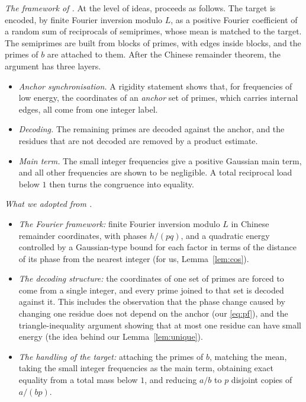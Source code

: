 \documentclass[11pt]{amsart}
\theoremstyle{definition}
\theoremstyle{remark}
\begin{document}
\emph{The framework of \cite{Tan26}.} At the level of ideas, \cite{Tan26} proceeds as follows. The target is encoded, by finite Fourier inversion modulo $L$, as a positive Fourier coefficient of a random sum of reciprocals of semiprimes, whose mean is matched to the target. The semiprimes are built from blocks of primes, with edges inside blocks, and the primes of $b$ are attached to them. After the Chinese remainder theorem, the argument has three layers.
\begin{itemize}
\item \emph{Anchor synchronisation.} A rigidity statement shows that, for frequencies of low energy, the coordinates of an \emph{anchor} set of primes, which carries internal edges, all come from one integer label.
\item \emph{Decoding.} The remaining primes are decoded against the anchor, and the residues that are not decoded are removed by a product estimate.
\item \emph{Main term.} The small integer frequencies give a positive Gaussian main term, and all other frequencies are shown to be negligible. A total reciprocal load below $1$ then turns the congruence into equality.
\end{itemize}


\emph{What we adopted from \cite{Tan26}.}
\begin{itemize}
\item \emph{The Fourier framework:} finite Fourier inversion modulo $L$ in Chinese remainder coordinates, with phases $h/(pq)$, and a quadratic energy controlled by a Gaussian-type bound for each factor in terms of the distance of its phase from the nearest integer (for us, Lemma~\ref{lem:cos}).
\item \emph{The decoding structure:} the coordinates of one set of primes are forced to come from a single integer, and every prime joined to that set is decoded against it. This includes the observation that the phase change caused by changing one residue does not depend on the anchor (our \eqref{eq:pf}), and the triangle-inequality argument showing that at most one residue can have small energy (the idea behind our Lemma~\ref{lem:unique}).
\item \emph{The handling of the target:} attaching the primes of $b$, matching the mean, taking the small integer frequencies as the main term, obtaining exact equality from a total mass below $1$, and reducing $a/b$ to $p$ disjoint copies of $a/(bp)$.
\end{itemize}
\end{document}
